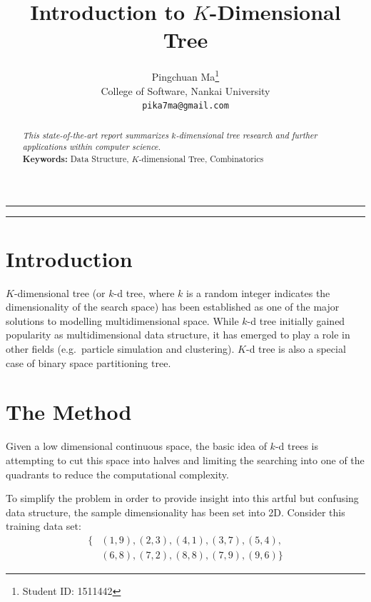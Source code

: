 \documentclass[12pt, a4paper]{article}
\begin{document}
    \title{\bf Introduction to $K$-Dimensional Tree}
    \author{
        {Pingchuan Ma\thanks{Student ID: 1511442}}\\
        College of Software, Nankai University\\
        {\tt pika7ma@gmail.com}
    }
    \date{}
    \maketitle

    \hrule

    \begin{abstract}
        \noindent
        {\sl This state-of-the-art report summarizes $k$-dimensional tree research and further applications within computer science.}\\
        {\bf Keywords:} Data Structure, $K$-dimensional Tree, Combinatorics
    \end{abstract}

    \hrule

    \section{Introduction}
        $K$-dimensional tree \cite{Bentley:1975:MBS:361002.361007} (or $k$-d tree, where $k$ is a random integer indicates the dimensionality of the search space) has been established as one of the major solutions to modelling multidimensional space. While $k$-d tree initially gained popularity as multidimensional data structure, it has emerged to play a role in other fields (e.g.\ particle simulation and clustering). $K$-d tree is also a special case of binary space partitioning tree.\\

    \section{The Method}
        Given a low dimensional continuous space, the basic idea of $k$-d trees is attempting to cut this space into halves and limiting the searching into one of the quadrants to reduce the computational complexity.

        To simplify the problem in order to provide insight into this artful but confusing data structure, the sample dimensionality has been set into 2D. Consider this training data set:
        \begin{equation*}\begin{split}
            \{&(1, 9), (2, 3), (4, 1), (3, 7), (5, 4),\\
              &(6, 8), (7, 2), (8, 8), (7, 9), (9, 6)\}
        \end{split}\end{equation*}
\end{document}
